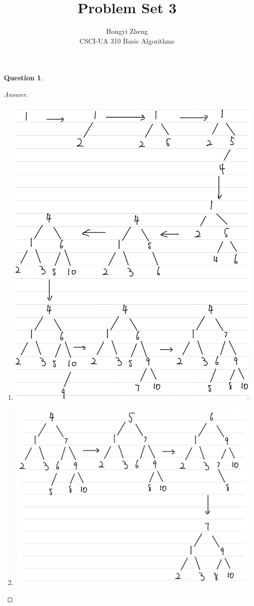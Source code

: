 \documentclass{article}
\title{Problem Set 3}
\author{%
    Hongyi Zheng
\\  CSCI-UA 310 Basic Algorithms
}
\theoremstyle{plain}
\newtheorem{question}{Question}
\newenvironment{answer}[1][Answer]
    {\begin{proof}[#1]{$ $}\renewcommand\qedsymbol{$\vartriangle$}}
    {\end{proof}}
\begin{document}
\maketitle


\begin{question}
\end{question}
\begin{answer}
    \begin{enumerate}
        \item
        \includegraphics[width=0.8\columnwidth]{Q1_1.jpg}
        \item
        \includegraphics[width=0.9\columnwidth]{Q1_2.jpg}
    \end{enumerate}
\end{answer}
\end{document}
